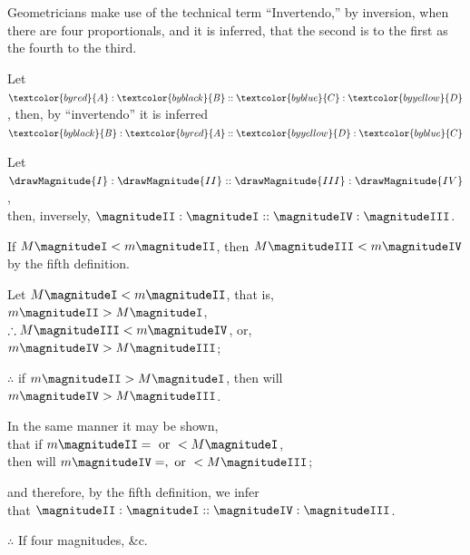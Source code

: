 \documentclass[booklanguage=english]{byrnebook}
\begin{document}
\def\varA{\textcolor{byred}{A}}
\def\varB{\textcolor{byblack}{B}}
\def\varC{\textcolor{byblue}{C}}
\def\varD{\textcolor{byyellow}{D}}
Geometricians make use of the technical term \enquote{Invertendo,} by inversion, when there are four proportionals, and it is inferred, that the second is to the first as the fourth to the third.

Let $\varA : \varB :: \varC : \varD$, then, by \enquote{invertendo} it is inferred $\varB : \varA :: \varD : \varC$

\vfill\pagebreak


\begin{center}
Let $\drawMagnitude{I} : \drawMagnitude{II} :: \drawMagnitude{III} : \drawMagnitude{IV}$,\\
then, inversely, $\magnitudeII : \magnitudeI :: \magnitudeIV : \magnitudeIII$.

If $M \magnitudeI < m \magnitudeII$, then $M \magnitudeIII < m \magnitudeIV$\\
by the fifth definition.

Let $M \magnitudeI < m \magnitudeII$, that is, $m \magnitudeII > M \magnitudeI$,\\
$\therefore M \magnitudeIII < m \magnitudeIV$, or, $m \magnitudeIV > M \magnitudeIII$;

$\therefore$ if $m \magnitudeII > M \magnitudeI$, then will $m \magnitudeIV > M \magnitudeIII$.

In the same manner it may be shown,\\
that if $m \magnitudeII = \mbox{ or } < M \magnitudeI$,\\
then will $m \magnitudeIV =, \mbox{ or } < M \magnitudeIII$;

and therefore, by the fifth definition, we infer\\
that $\magnitudeII : \magnitudeI :: \magnitudeIV : \magnitudeIII$.

$\therefore$ If four magnitudes, \&c.
\end{center}

\vfill\pagebreak
\end{document}
